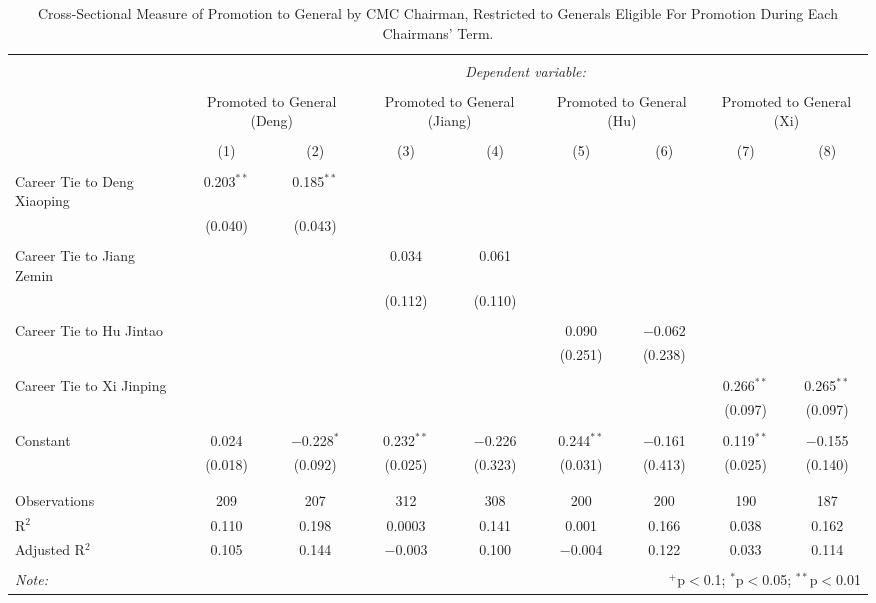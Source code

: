 \documentclass[12pt,letterpaper]{article}
\begin{document}
\begin{table}[!htbp] \centering 
	\caption{Cross-Sectional Measure of Promotion to General by CMC Chairman, Restricted to Generals Eligible For Promotion During Each Chairmans' Term.} 
	\label{table_a18} 
	\begin{tabular}{@{\extracolsep{5pt}}lcccccccc} 
		\\[-1.8ex]\hline 
		\hline \\[-1.8ex] 
		& \multicolumn{8}{c}{\textit{Dependent variable:}} \\ 
		\cline{2-9} 
		\\[-1.8ex] & \multicolumn{2}{c}{Promoted to General (Deng)} & \multicolumn{2}{c}{Promoted to General (Jiang)} & \multicolumn{2}{c}{Promoted to General (Hu)} & \multicolumn{2}{c}{Promoted to General (Xi)} \\ 
		\\[-1.8ex] & (1) & (2) & (3) & (4) & (5) & (6) & (7) & (8)\\ 
		\hline \\[-1.8ex] 
		Career Tie to Deng Xiaoping & 0.203$^{**}$ & 0.185$^{**}$ &  &  &  &  &  &  \\ 
		& (0.040) & (0.043) &  &  &  &  &  &  \\ 
		& & & & & & & & \\ 
		Career Tie to Jiang Zemin &  &  & 0.034 & 0.061 &  &  &  &  \\ 
		&  &  & (0.112) & (0.110) &  &  &  &  \\ 
		& & & & & & & & \\ 
		Career Tie to Hu Jintao &  &  &  &  & 0.090 & $-$0.062 &  &  \\ 
		&  &  &  &  & (0.251) & (0.238) &  &  \\ 
		& & & & & & & & \\ 
		Career Tie to Xi Jinping &  &  &  &  &  &  & 0.266$^{**}$ & 0.265$^{**}$ \\ 
		&  &  &  &  &  &  & (0.097) & (0.097) \\ 
		& & & & & & & & \\ 
		Constant & 0.024 & $-$0.228$^{*}$ & 0.232$^{**}$ & $-$0.226 & 0.244$^{**}$ & $-$0.161 & 0.119$^{**}$ & $-$0.155 \\ 
		& (0.018) & (0.092) & (0.025) & (0.323) & (0.031) & (0.413) & (0.025) & (0.140) \\ 
		& & & & & & & & \\ 
		\hline \\[-1.8ex] 
		Observations & 209 & 207 & 312 & 308 & 200 & 200 & 190 & 187 \\ 
		R$^{2}$ & 0.110 & 0.198 & 0.0003 & 0.141 & 0.001 & 0.166 & 0.038 & 0.162 \\ 
		Adjusted R$^{2}$ & 0.105 & 0.144 & $-$0.003 & 0.100 & $-$0.004 & 0.122 & 0.033 & 0.114 \\ 
		\hline 
		\hline \\[-1.8ex] 
		\textit{Note:}  & \multicolumn{8}{r}{$^{+}$p$<$0.1; $^{*}$p$<$0.05; $^{**}$p$<$0.01}} \\ 
\end{tabular} 
\end{table} 
\end{document}
